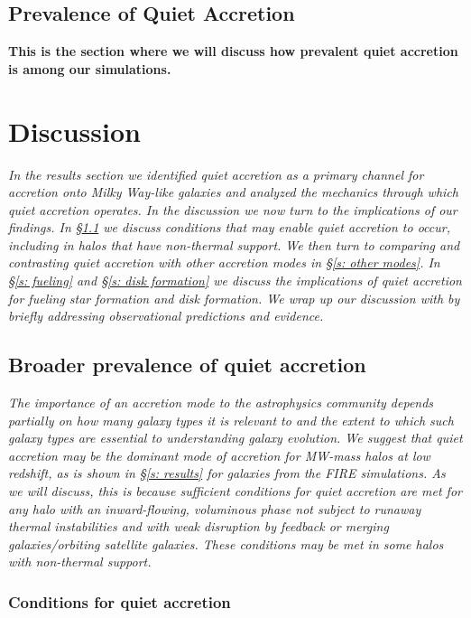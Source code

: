 \documentclass[fleqn,usenatbib]{mnras}
\begin{document}
\subsection{Prevalence of Quiet Accretion}

\textbf{
This is the section where we will discuss how prevalent quiet accretion is among our simulations.
}

\section{Discussion}
\label{s: discussion}

\textit{
In the results section we identified quiet accretion as a primary channel for accretion onto Milky Way-like galaxies and analyzed the mechanics through which quiet accretion operates.
In the discussion we now turn to the implications of our findings.
In \S\ref{s: prevalence} we discuss conditions that may enable quiet accretion to occur, including in halos that have non-thermal support.
We then turn to comparing and contrasting quiet accretion with other accretion modes in \S\ref{s: other modes}.
In \S\ref{s: fueling} and \S\ref{s: disk formation} we discuss the implications of quiet accretion for fueling star formation and disk formation.
We wrap up our discussion with by briefly addressing observational predictions and evidence.
}

\subsection{Broader prevalence of quiet accretion}
\label{s: prevalence}

\textit{
The importance of an accretion mode to the astrophysics community depends partially on how many galaxy types it is relevant to and the extent to which such galaxy types are essential to understanding galaxy evolution.
We suggest that quiet accretion may be the dominant mode of accretion for MW-mass halos at low redshift, as is shown in \S\ref{s: results} for galaxies from the FIRE simulations.
As we will discuss, this is because sufficient conditions for quiet accretion are met for any halo with an inward-flowing, voluminous phase not subject to runaway thermal instabilities and with weak disruption by feedback or merging galaxies/orbiting satellite galaxies.
These conditions may be met in some halos with non-thermal support.
}

\subsubsection{Conditions for quiet accretion}
\label{s: prevalence -- conditions}
\end{document}
